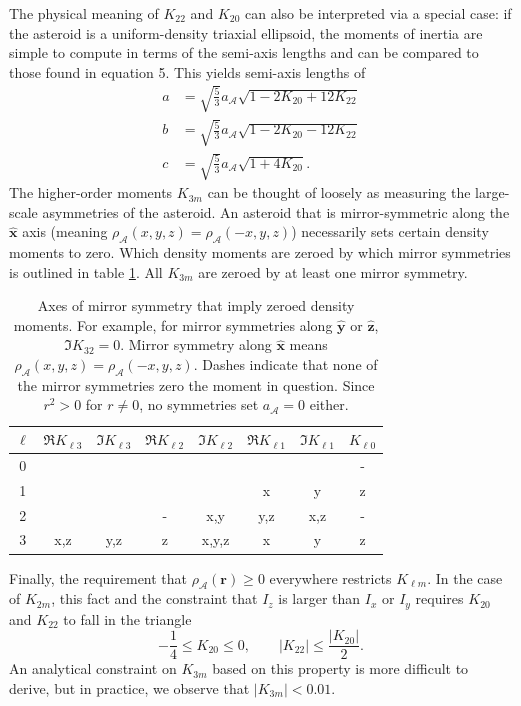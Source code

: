 \documentclass[9pt,twocolumn]{article}
\newcommand{\unit}[1]{\bm{\hat{#1}}}
\numberwithin{equation}{section}
\begin{document}
The physical meaning of $K_{22}$ and $K_{20}$ can also be interpreted via a special case: if the asteroid is a uniform-density triaxial ellipsoid, the moments of inertia are simple to compute in terms of the semi-axis lengths and can be compared to those found in equation 5. This yields semi-axis lengths of 
\begin{equation}
  \begin{split}
  a &= \sqrt{\frac{5}{3}}a_\mathcal{A}\sqrt{1-2K_{20}+12K_{22}}\\
  b &= \sqrt{\frac{5}{3}}a_\mathcal{A}\sqrt{1-2K_{20}-12K_{22}}\\
  c &= \sqrt{\frac{5}{3}}a_\mathcal{A}\sqrt{1+4K_{20}}.
  \label{eqn:ellipsoid-axes}
  \end{split}
\end{equation}
The higher-order moments $K_{3m}$ can be thought of loosely as measuring the large-scale asymmetries of the asteroid. An asteroid that is mirror-symmetric along the $\unit{x}$ axis (meaning $\rho_\mathcal{A}(x,y,z)=\rho_\mathcal{A}(-x,y,z)$) necessarily sets certain density moments to zero. Which density moments are zeroed by which mirror symmetries is outlined in table \ref{tab:klm-symmetries}. All $K_{3m}$ are zeroed by at least one mirror symmetry. 

\begin{table}
  \centering
  \small
  \begin{tabular}{c|ccccccc}
    \hline
    $\ell$ & $\Re K_{\ell 3}$ & $\Im K_{\ell 3}$ & $\Re K_{\ell 2}$ & $\Im K_{\ell 2}$ & $\Re K_{\ell 1}$ & $\Im K_{\ell 1}$ & $K_{\ell 0}$ \\ \hline
    0 &  &  &  &  &  &  & -\\ 
    1 &  &  &  &  & x & y & z\\ 
    2 &  &  & - & x,y & y,z & x,z & -\\ 
    3 & x,z & y,z & z & x,y,z & x & y & z\\ \hline
  \end{tabular}
  \caption{Axes of mirror symmetry that imply zeroed density moments. For example, for mirror symmetries along $\unit y$ or $\unit z$, $\Im K_{32}=0$. Mirror symmetry along $\unit x$ means $\rho_\mathcal{A}(x, y, z) = \rho_\mathcal{A}(-x, y, z)$. Dashes indicate that none of the mirror symmetries zero the moment in question. Since $r^2>0$ for $r\neq 0$, no symmetries set $a_\mathcal{A}=0$ either.}
  \label{tab:klm-symmetries}
\end{table} 

Finally, the requirement that $\rho_\mathcal{A}(\bm r) \geq 0$ everywhere restricts $K_{\ell m}$. In the case of $K_{2m}$, this fact and the constraint that $I_z$ is larger than $I_x$ or $I_y$ requires $K_{20}$ and $K_{22}$ to fall in the triangle
\begin{equation}
  -\frac{1}{4} \leq K_{20} \leq 0, \qquad |K_{22}| \leq \frac{|K_{20}|}{2}.
  \label{eqn:parameter-bounds}
\end{equation}
An analytical constraint on $K_{3m}$ based on this property is more difficult to derive, but in practice, we observe that $|K_{3m}| < 0.01$.
\end{document}
